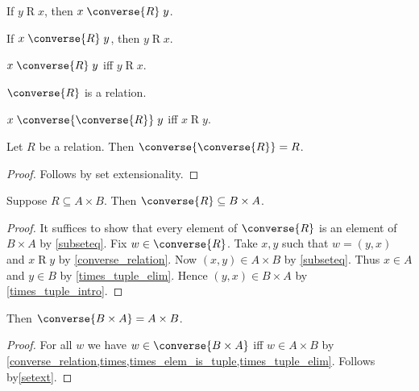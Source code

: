 \begin{proposition}\label{converse_intro}
    If $y\mathrel{R} x$, then $x\mathrel{\converse{R}} y$.
\end{proposition}

\begin{proposition}\label{converse_elim}
    If $x\mathrel{\converse{R}} y$, then $y\mathrel{R} x$.
\end{proposition}

\begin{proposition}\label{converse_iff}
    $x\mathrel{\converse{R}} y$ iff $y\mathrel{R} x$.
\end{proposition}


\begin{proposition}\label{converse_is_relation}
    $\converse{R}$ is a relation.
\end{proposition}


\begin{proposition}\label{converse_converse_iff}
    $x \mathrel{\converse{\converse{R}}} y$ iff $x\mathrel{R} y$.
\end{proposition}

\begin{proposition}\label{converse_converse_eq}
    Let $R$ be a relation.
    Then $\converse{\converse{R}} = R$.
\end{proposition}
\begin{proof}
    Follows by set extensionality.
\end{proof}

\begin{proposition}\label{converse_type}
    Suppose $R\subseteq A\times B$.
    Then $\converse{R}\subseteq B\times A$.
\end{proposition}
\begin{proof}
    It suffices to show that every element of $\converse{R}$ is an element of $B\times A$
        by \cref{subseteq}.
    Fix $w\in\converse{R}$.
    Take $x, y$ such that $w = (y, x)$ and $x\mathrel{R} y$ by \cref{converse_relation}.
    Now $(x,y)\in A\times B$ by \cref{subseteq}.
    Thus $x\in A$ and $y\in B$ by \cref{times_tuple_elim}.
    Hence $(y,x)\in B\times A$ by \cref{times_tuple_intro}.
\end{proof}

\begin{proposition}\label{converse_times}
    Then $\converse{B\times A} = A\times B$.
\end{proposition}
\begin{proof}
    For all $w$ we have $w\in\converse{B\times A}$ iff $w\in A\times B$
        by \cref{converse_relation,times,times_elem_is_tuple,times_tuple_elim}.
    Follows by\cref{setext}.
\end{proof}

